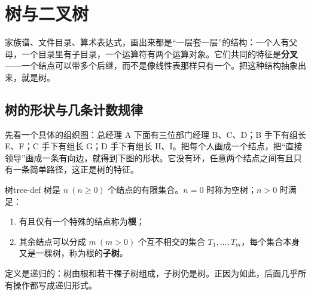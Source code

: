 \section{树与二叉树}

家族谱、文件目录、算术表达式，画出来都是“一层套一层”的结构：一个人有父母，一个目录里有子目录，一个运算符有两个运算对象。它们共同的特征是\textbf{分叉}——一个结点可以带多个后继，而不是像线性表那样只有一个。把这种结构抽象出来，就是树。

\subsection{树的形状与几条计数规律}

先看一个具体的组织图：总经理 A 下面有三位部门经理 B、C、D；B 手下有组长 E、F；C 手下有组长 G；D 手下有组长 H、I。把每个人画成一个结点，把“直接领导”画成一条有向边，就得到下图的形状。它没有环，任意两个结点之间有且只有一条简单路径，这正是树的特征。

\begin{mydef}{树}{tree-def}
树是 $n\ (n\geqslant 0)$ 个结点的有限集合。$n=0$ 时称为空树；$n>0$ 时满足：
\begin{enumerate}
  \item 有且仅有一个特殊的结点称为\textbf{根}；
  \item 其余结点可以分成 $m\ (m>0)$ 个互不相交的集合 $T_1,\ldots,T_m$，每个集合本身又是一棵树，称为根的\textbf{子树}。
\end{enumerate}
定义是递归的：树由根和若干棵子树组成，子树仍是树。正因为如此，后面几乎所有操作都写成递归形式。
\end{mydef}

